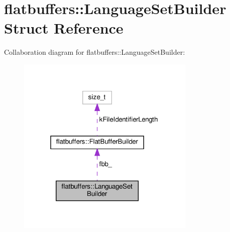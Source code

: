 \hypertarget{structflatbuffers_1_1LanguageSetBuilder}{}\section{flatbuffers\+:\+:Language\+Set\+Builder Struct Reference}
\label{structflatbuffers_1_1LanguageSetBuilder}


Collaboration diagram for flatbuffers\+:\+:Language\+Set\+Builder\+:
\nopagebreak
\begin{figure}[H]
\begin{center}
\leavevmode
\includegraphics[width=241pt]{structflatbuffers_1_1LanguageSetBuilder__coll__graph}
\end{center}
\end{figure}
